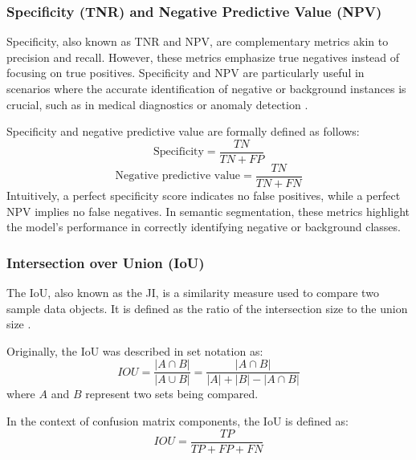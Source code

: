 \subsubsection*{Specificity (TNR) and Negative Predictive Value (NPV)}
\label{subsubsec:specificity_and_negative_predictive_value}
Specificity, also known as \ac{TNR} and \ac{NPV}, are complementary metrics akin to precision and recall. However, these metrics emphasize true negatives instead of focusing on true positives. Specificity and \ac{NPV} are particularly useful in scenarios where the accurate identification of negative or background instances is crucial, such as in medical diagnostics \cite{Parikh2008-bd} or anomaly detection \cite{Henson2021}.

Specificity and negative predictive value are formally defined as follows:
\begin{equation}
    \text{Specificity}=\frac{TN}{TN+FP}
\end{equation}
\begin{equation}
    \text{Negative predictive value}=\frac{TN}{TN+FN}
\end{equation}
Intuitively, a perfect specificity score indicates no false positives, while a perfect \ac{NPV} implies no false negatives. In semantic segmentation, these metrics highlight the model's performance in correctly identifying negative or background classes.

\subsubsection*{Intersection over Union (IoU)}
\label{subsubsec:jaccard_index}
The \ac{IoU}, also known as the \ac{JI}, is a similarity measure used to compare two sample data objects. It is defined as the ratio of the intersection size to the union size \cite{Verma2020}.

Originally, the \ac{IoU} was described in set notation as:
\begin{equation}
    IOU=\frac{|A\cap B|}{|A \cup B|}=\frac{|A \cap B|}{|A|+|B|-|A\cap B|}
\end{equation}
where $A$ and $B$ represent two sets being compared.

In the context of confusion matrix components, the \ac{IoU} is defined as:
\begin{equation}
    IOU=\frac{TP}{TP+FP+FN}
\end{equation}
